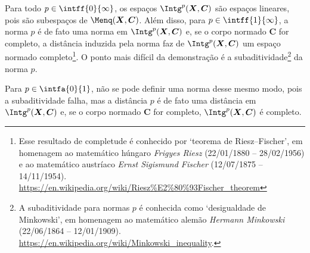 Para todo $p \in \intff{0}{\infty}$, os espaços $\Intg^p(\bm X,\bm C)$ são espaços lineares, pois são subespaços de $\Menq(\bm X,\bm C)$. Além disso, para $p \in \intff{1}{\infty}$, a norma $p$ é de fato uma norma em $\Intg^p(\bm X,\bm C)$ e, se o corpo normado $\bm C$ for completo, a distância induzida pela norma faz de $\Intg^p(\bm X,\bm C)$ um espaço normado completo\footnote{Esse resultado de completude é conhecido por `teorema de Riesz–Fischer', em homenagem ao matemático húngaro \textit{Frigyes Riesz} (22/01/1880 -- 28/02/1956) e ao matemático austríaco \textit{Ernst Sigismund Fischer} (12/07/1875 -- 14/11/1954). \url{https://en.wikipedia.org/wiki/Riesz\%E2\%80\%93Fischer_theorem}}. O ponto mais difícil da demonstração é a subaditividade\footnote{A subaditividade para normas $p$ é conhecida como `desigualdade de Minkowski', em homenagem ao matemático alemão \textit{Hermann Minkowski} (22/06/1864 -- 12/01/1909). \url{https://en.wikipedia.org/wiki/Minkowski_inequality}.} da norma $p$.

Para $p \in \intfa{0}{1}$, não se pode definir uma norma desse mesmo modo, pois a subaditividade falha, mas a distância $p$ é de fato uma distância em $\Intg^p(\bm X,\bm C)$ e, se o corpo normado $\bm C$ for completo, $\Intg^p(\bm X,\bm C)$ é completo.

